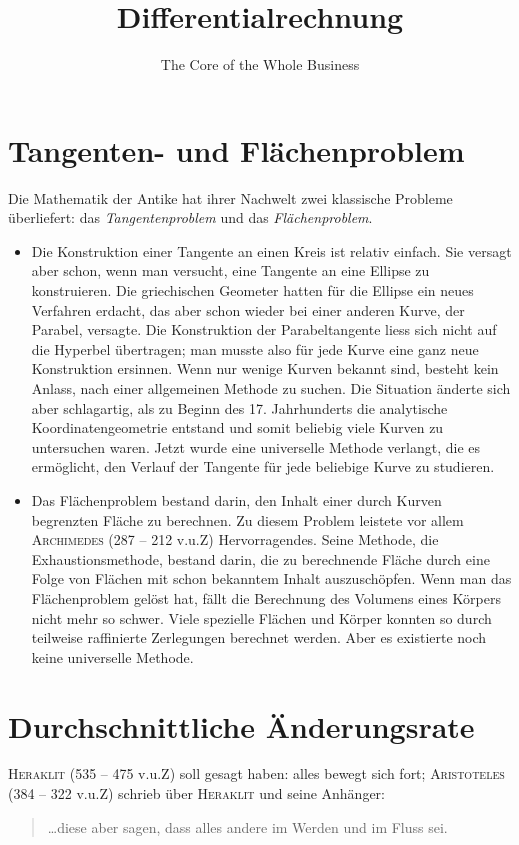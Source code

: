 \documentclass[%
11pt,%
twoside,%
titlepage,%
german,%
headsepline%
]{scrartcl}
\title{Differentialrechnung}
\subtitle{The Core of the Whole Business}
\author{}
\date{}
\begin{document}
\maketitle
\tableofcontents
\cleardoublepage

\section{Tangenten- und Fl\"achenproblem}
Die Mathematik der Antike hat ihrer Nachwelt zwei klassische Probleme \"uberliefert: das \emph{Tangentenproblem} und das \emph{Fl\"achenproblem}.

\begin{itemize}
\item Die Konstruktion einer Tangente an einen Kreis ist relativ einfach. Sie versagt aber schon, wenn man versucht, eine Tangente an eine Ellipse zu konstruieren. Die griechischen Geometer hatten f\"ur die Ellipse ein neues Verfahren erdacht, das aber schon wieder bei einer anderen Kurve, der Parabel, versagte. Die Konstruktion der Parabeltangente liess sich nicht auf die Hyperbel \"ubertragen; man musste also f\"ur jede Kurve eine ganz neue Konstruktion ersinnen. Wenn nur wenige Kurven bekannt sind, besteht kein Anlass, nach einer allgemeinen Methode zu suchen. Die Situation \"anderte sich aber schlagartig, als zu Beginn des 17. Jahrhunderts die analytische Koordinatengeometrie entstand und somit beliebig viele Kurven zu untersuchen waren. Jetzt wurde eine universelle Methode verlangt, die es erm\"oglicht, den Verlauf der Tangente f\"ur jede beliebige Kurve zu studieren.
\end{itemize}

\begin{itemize}
\item Das Fl\"achenproblem bestand darin, den Inhalt einer durch Kurven begrenzten Fl\"ache zu berechnen. Zu diesem Problem leistete vor allem \textsc{Archimedes} (287 -- 212 v.u.Z) Hervorragendes. Seine Methode, die Exhaustionsmethode, bestand darin, die zu berechnende Fl\"ache durch eine Folge von Fl\"achen mit schon bekanntem Inhalt auszusch\"opfen. Wenn man das Fl\"achenproblem gel\"ost hat, f\"allt die Berechnung des Volumens eines K\"orpers nicht mehr so schwer. Viele spezielle Fl\"achen und K\"orper konnten so durch teilweise raffinierte Zerlegungen berechnet werden. Aber es existierte noch keine universelle Methode.
\end{itemize}

\section{Durchschnittliche \"Anderungsrate}
\textsc{Heraklit} (535 -- 475 v.u.Z) soll gesagt haben: \glqq alles bewegt sich fort\grqq; \textsc{Aristoteles} (384 -- 322 v.u.Z) schrieb \"uber \textsc{Heraklit} und seine Anh\"anger:
\begin{quote}
\glqq\dots diese aber sagen, dass alles andere im Werden und im Fluss sei.\grqq
\end{quote}
\end{document}
